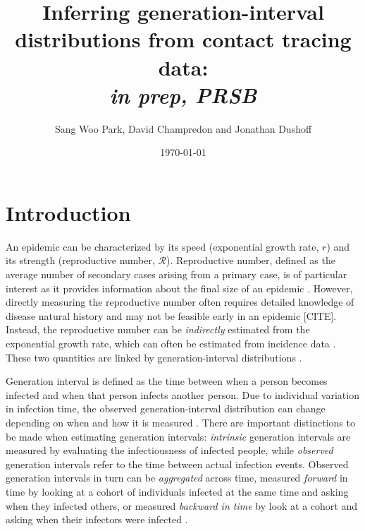 \documentclass[12pt]{article}
\title{Inferring generation-interval distributions from contact tracing data: \\ \emph{in prep, PRSB}}
\author{Sang Woo Park, David Champredon and Jonathan Dushoff}
\date{\today}
\newcommand{\RR}{\ensuremath{{\mathcal R}}}
\begin{document}
\maketitle

\section{Introduction}


An epidemic can be characterized by its speed (exponential growth rate, $r$) and its strength (reproductive number, \RR).
Reproductive number, defined as the average number of secondary cases arising from a primary case, is of particular interest as it provides information about the final size of an epidemic \citep{anderson1991infectious, diekmann1990definition}.
However, directly measuring the reproductive number often requires detailed knowledge of disease natural history and may not be feasible early in an epidemic [CITE].
Instead, the reproductive number can be \emph{indirectly} estimated from the exponential growth rate, which can often be estimated from incidence data \citep{mills2004transmissibility, nishiura2009transmission, ma2014estimating}.
These two quantities are linked by generation-interval distributions \citep{wallinga2007generation, park2019practical}.

Generation interval is defined as the time between when a person becomes infected and when that person infects another person.
Due to individual variation in infection time, the observed generation-interval distribution can change depending on when and how it is measured \citep{svensson2007note, kenah2008generation, nishiura2010time, champredon2015intrinsic}.
There are important distinctions to be made when estimating generation intervals: \emph{intrinsic} generation intervals are measured by evaluating the infectiousness of infected people,
while \emph{observed} generation intervals refer to the time between actual infection events.
Observed generation intervals in turn can be \emph{aggregated} across time, measured \emph{forward} in time by looking at a cohort of individuals infected at the same time and asking when they infected others, or measured \emph{backward in time} by look at a cohort and asking when their infectors were infected \citep{champredon2015intrinsic}.
\end{document}
